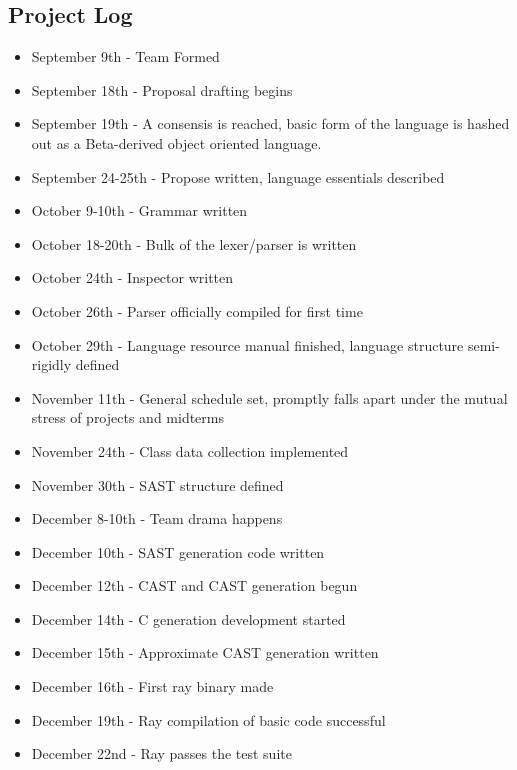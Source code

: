 \pagebreak
\subsection*{Project Log}
\begin{itemize}

\item September 9th - Team Formed
\item September 18th - Proposal drafting begins
\item September 19th - A consensis is reached, basic form of the language is hashed out as a Beta-derived object oriented language.
\item September 24-25th - Propose written, language essentials described
\item October 9-10th - Grammar written
\item October 18-20th - Bulk of the lexer/parser is written
\item October 24th - Inspector written
\item October 26th - Parser officially compiled for first time
\item October 29th - Language resource manual finished, language structure semi-rigidly defined
\item November 11th - General schedule set, promptly falls apart under the mutual stress of projects and midterms
\item November 24th - Class data collection implemented
\item November 30th - SAST structure defined
\item December 8-10th - Team drama happens
\item December 10th - SAST generation code written
\item December 12th - CAST and CAST generation begun
\item December 14th - C generation development started
\item December 15th - Approximate CAST generation written
\item December 16th - First ray binary made
\item December 19th - Ray compilation of basic code successful
\item December 22nd - Ray passes the test suite
\end{itemize}